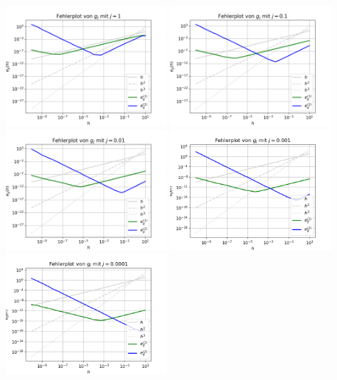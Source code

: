 \documentclass{scrartcl}
\begin{document}
{    \includegraphics[width=0.45\textwidth]{Grafiken/Fehlerplot_j1}
    \includegraphics[width=0.45\textwidth]{Grafiken/Fehlerplot_j01}\\
    \includegraphics[width=0.45\textwidth]{Grafiken/Fehlerplot_j001}
    \includegraphics[width=0.45\textwidth]{Grafiken/Fehlerplot_j0001}\\
    \includegraphics[width=0.45\textwidth]{Grafiken/Fehlerplot_j00001}
}
\end{document}
